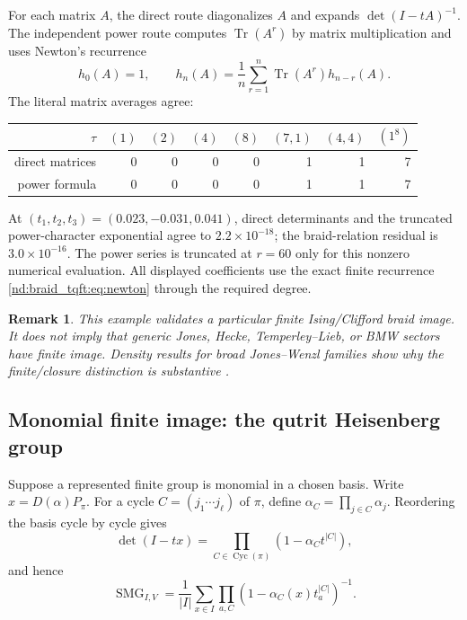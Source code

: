 \documentclass[10pt]{article}
\newcommand{\Tr}{\operatorname{Tr}}
\newcommand{\SMG}{\operatorname{SMG}}
\newcommand{\MGF}{\SMG}
\newtheorem{remark}{Remark}
\begin{document}
For each matrix $A$, the direct route diagonalizes $A$ and expands
$\det(I-tA)^{-1}$.  The independent power route computes $\Tr(A^r)$ by matrix
multiplication and uses Newton's recurrence
\begin{equation}\label{nd:braid_tqft:eq:newton}
h_0(A)=1,\qquad h_n(A)=\frac1n\sum_{r=1}^n
\Tr(A^r)h_{n-r}(A).
\end{equation}
The literal matrix averages agree:
\begin{center}
\begin{tabular}{@{}rrrrrrrr@{}}
\toprule
$\tau$ & $(1)$ & $(2)$ & $(4)$ & $(8)$ & $(7,1)$ & $(4,4)$ & $(1^8)$\\
\midrule
direct matrices &0&0&0&0&1&1&7\\
power formula   &0&0&0&0&1&1&7\\
\bottomrule
\end{tabular}
\end{center}
At $(t_1,t_2,t_3)=(0.023,-0.031,0.041)$, direct determinants and the
truncated power-character exponential agree to $2.2\times10^{-18}$; the
braid-relation residual is $3.0\times10^{-16}$.  The power series is truncated
at $r=60$ only for this nonzero numerical evaluation.  All displayed
coefficients use the exact finite recurrence \eqref{nd:braid_tqft:eq:newton} through the
required degree.

\begin{remark}
This example validates a particular finite Ising/Clifford braid image.  It
does not imply that generic Jones, Hecke, Temperley--Lieb, or BMW sectors have
finite image.  Density results for broad Jones--Wenzl families show why the
finite/closure distinction is substantive \cite{nd:braid_tqft:flw}.
\end{remark}

\subsection{Monomial finite image: the qutrit Heisenberg group}

Suppose a represented finite group is monomial in a chosen basis.  Write
$x=D(\alpha)P_\pi$.  For a cycle $C=(j_1\cdots j_\ell)$ of $\pi$, define
$\alpha_C=\prod_{j\in C}\alpha_j$.  Reordering the basis cycle by cycle gives
\begin{equation}\label{nd:braid_tqft:eq:monomial-det}
\det(I-tx)=\prod_{C\in\operatorname{Cyc}(\pi)}
(1-\alpha_Ct^{|C|}),
\end{equation}
and hence
\begin{equation}\label{nd:braid_tqft:eq:monomial-mgf}
\boxed{\MGF_{I,V}=\frac1{|I|}\sum_{x\in I}
\prod_{a,C}(1-\alpha_C(x)t_a^{|C|})^{-1}.}
\end{equation}
\end{document}
